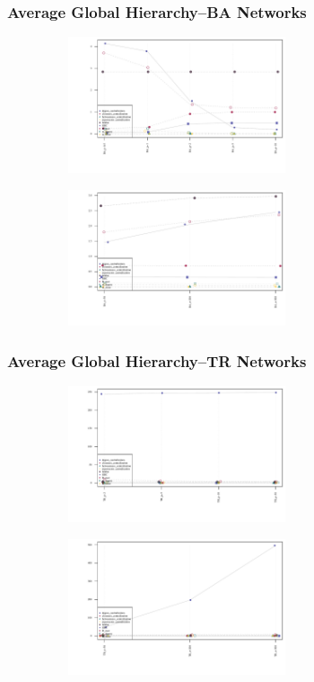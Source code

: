 \documentclass{beamer}
\newenvironment{changemargin}[2]{%
	\begin{list}{}{%
			\setlength{\topsep}{0pt}%
			\setlength{\leftmargin}{#1}%
			\setlength{\rightmargin}{#2}%
			\setlength{\listparindent}{\parindent}%
			\setlength{\itemindent}{\parindent}%
			\setlength{\parsep}{\parskip}%
		}%
		\item[]}{\end{list}}
\begin{document}
\begin{frame}\frametitle{Average Global Hierarchy--BA Networks}
	\begin{changemargin}{-2cm}{ -2cm}
		\centering
		 \par
		 \includegraphics[width=10cm, height=4cm]{images/BA_Param_Averages.pdf}
		\\
		\vspace{-5mm}
		 \par
		\includegraphics[width=10cm, height=4cm]{images/BA_Size_Averages.pdf}
	\end{changemargin}
\end{frame}


\begin{frame}\frametitle{Average Global Hierarchy--TR Networks}
	\begin{changemargin}{-2cm}{ -2cm}
		\centering
		\par
		\includegraphics[width=10cm, height=4cm]{images/TR_Param_Averages.pdf}
		\\
		\vspace{-5mm}
		\par
		\includegraphics[width=10cm, height=4cm]{images/TR_Size_Averages.pdf}
	\end{changemargin}
\end{frame}
\end{document}
